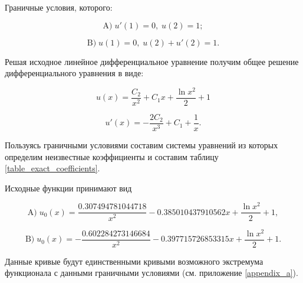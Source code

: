 \documentclass{article}
\begin{document}
\noindent Граничные условия, которого:

\begin{displaymath}
	\text{A)} \; u'(1) = 0, \; u(2) = 1;
\end{displaymath}

\begin{displaymath}
	\text{B)} \; u(1) = 0, \; u(2) + u'(2) = 1.
\end{displaymath}

\noindent Решая исходное линейное дифференциальное уравнение получим общее решение дифференциального уравнения в виде:

\begin{displaymath}
	u(x) = \frac{C_{2}}{x^2} + C_{1}x + \frac{\ln{x^2}}{2} + 1
\end{displaymath}

\begin{displaymath}
	u'(x) = - \frac{2C_{2}}{x^3} + C_{1} + \frac{1}{x}.
\end{displaymath}

Пользуясь граничными условиями составим системы уравнений из которых определим неизвестные коэффициенты и составим таблицу \ref{table_exact_coefficients}. 

\noindent Исходные функции принимают вид

\begin{displaymath}
	\text{A)} \; u_{0}(x) = \frac{0.307494781044718}{x^2} - 0.385010437910562 x + \frac{\ln{x^2}}{2} + 1,
\end{displaymath}

\begin{displaymath}
	\text{B)} \; u_{0}(x) = - \frac{0.602284273146684}{x^2} - 0.397715726853315 x + \frac{\ln{x^2}}{2} + 1.
\end{displaymath}

Данные кривые будут единственными кривыми возможного экстремума функционала с данными граничными условиями (см. приложение \ref{appendix_a}). 
\end{document}
